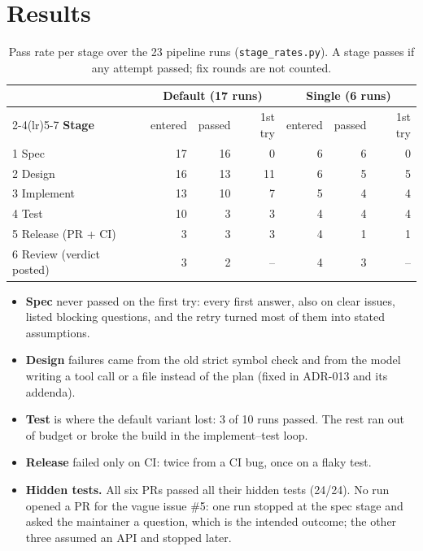 \documentclass[11pt,a4paper]{article}
\newcommand{\code}[1]{\texttt{#1}}
\begin{document}
\section{Results}

\begin{table}[H]
\centering\small
\begin{tabular}{@{}l rrr rrr@{}}
\toprule
 & \multicolumn{3}{c}{\textbf{Default (17 runs)}} & \multicolumn{3}{c}{\textbf{Single (6 runs)}} \\
\cmidrule(lr){2-4}\cmidrule(lr){5-7}
\textbf{Stage} & entered & passed & 1st try & entered & passed & 1st try \\
\midrule
1 Spec & 17 & 16 & 0 & 6 & 6 & 0 \\
2 Design & 16 & 13 & 11 & 6 & 5 & 5 \\
3 Implement & 13 & 10 & 7 & 5 & 4 & 4 \\
4 Test & 10 & 3 & 3 & 4 & 4 & 4 \\
5 Release (PR + CI) & 3 & 3 & 3 & 4 & 1 & 1 \\
6 Review (verdict posted) & 3 & 2 & -- & 4 & 3 & -- \\
\bottomrule
\end{tabular}
\caption{Pass rate per stage over the 23 pipeline runs (\code{stage\_rates.py}). A stage passes if any attempt passed; fix rounds are not counted.}
\end{table}

\begin{itemize}
  \item \textbf{Spec} never passed on the first try: every first answer, also on clear issues, listed
        blocking questions, and the retry turned most of them into stated assumptions.
  \item \textbf{Design} failures came from the old strict symbol check and from the model writing a tool
        call or a file instead of the plan (fixed in ADR-013 and its addenda).
  \item \textbf{Test} is where the default variant lost: 3 of 10 runs passed. The rest ran out of budget or
        broke the build in the implement--test loop.
  \item \textbf{Release} failed only on CI: twice from a CI bug, once on a flaky test.
  \item \textbf{Hidden tests.} All six PRs passed all their hidden tests (24/24). No run opened a PR for the
        vague issue \#5: one run stopped at the spec stage and asked the maintainer a question, which is the
        intended outcome; the other three assumed an API and stopped later.
\end{itemize}
\end{document}
